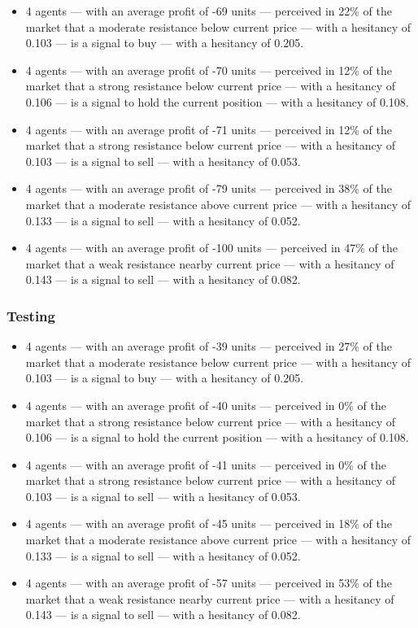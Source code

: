 {\small
  \begin{itemize}
  \item 4 agents — with an average profit of -69 units — perceived in 22\% of
    the market that a moderate resistance below current price — with a hesitancy
    of 0.103 — is a signal to buy — with a hesitancy of 0.205.
  \item 4 agents — with an average profit of -70 units — perceived in 12\% of
    the market that a strong resistance below current price — with a hesitancy
    of 0.106 — is a signal to hold the current position — with a hesitancy of
    0.108.
  \item 4 agents — with an average profit of -71 units — perceived in 12\% of
    the market that a strong resistance below current price — with a hesitancy
    of 0.103 — is a signal to sell — with a hesitancy of 0.053.
  \item 4 agents — with an average profit of -79 units — perceived in 38\% of
    the market that a moderate resistance above current price — with a hesitancy
    of 0.133 — is a signal to sell — with a hesitancy of 0.052.
  \item 4 agents — with an average profit of -100 units — perceived in 47\% of
    the market that a weak resistance nearby current price — with a hesitancy of
    0.143 — is a signal to sell — with a hesitancy of 0.082.
  \end{itemize}
}

\subsubsection{Testing}

{\small
  \begin{itemize}
  \item 4 agents — with an average profit of -39 units — perceived in 27\% of
    the market that a moderate resistance below current price — with a hesitancy
    of 0.103 — is a signal to buy — with a hesitancy of 0.205.
  \item 4 agents — with an average profit of -40 units — perceived in 0\% of the
    market that a strong resistance below current price — with a hesitancy of
    0.106 — is a signal to hold the current position — with a hesitancy of
    0.108.
  \item 4 agents — with an average profit of -41 units — perceived in 0\% of the
    market that a strong resistance below current price — with a hesitancy of
    0.103 — is a signal to sell — with a hesitancy of 0.053.
  \item 4 agents — with an average profit of -45 units — perceived in 18\% of
    the market that a moderate resistance above current price — with a hesitancy
    of 0.133 — is a signal to sell — with a hesitancy of 0.052.
  \item 4 agents — with an average profit of -57 units — perceived in 53\% of
    the market that a weak resistance nearby current price — with a hesitancy of
    0.143 — is a signal to sell — with a hesitancy of 0.082.
  \end{itemize}
}

